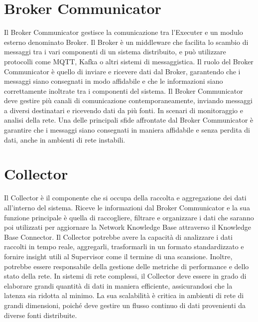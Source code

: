 \documentclass[target=bach,aauheader=,style=]{thud}
\begin{document}
\section{Broker Communicator}
Il Broker Communicator gestisce la comunicazione tra l'Executer e un modulo esterno denominato Broker. Il Broker è un middleware che facilita lo scambio di messaggi tra i vari componenti di un sistema distribuito, e può utilizzare protocolli come MQTT, Kafka \cite{kreps2015kafka} o altri sistemi di messaggistica. Il ruolo del Broker Communicator è quello di inviare e ricevere dati dal Broker, garantendo che i messaggi siano consegnati in modo affidabile e che le informazioni siano correttamente inoltrate tra i componenti del sistema.
Il Broker Communicator deve gestire più canali di comunicazione contemporaneamente, inviando messaggi a diversi destinatari e ricevendo dati da più fonti. In scenari di monitoraggio e analisi della rete. Una delle principali sfide affrontate dal Broker Communicator è garantire che i messaggi siano consegnati in maniera affidabile e senza perdita di dati, anche in ambienti di rete instabili. 

\section{Collector}
Il Collector è il componente che si occupa della raccolta e aggregazione dei dati all'interno del sistema. Riceve le informazioni dal Broker Communicator e la sua funzione principale è quella di raccogliere, filtrare e organizzare i dati che saranno poi utilizzati per aggiornare la Network Knowledge Base attraverso il Knowledge Base Connector.
Il Collector potrebbe avere la capacità di analizzare i dati raccolti in tempo reale, aggregarli, trasformarli in un formato standardizzato e fornire insight utili al Supervisor come il termine di una scansione. Inoltre, potrebbe essere responsabile della gestione delle metriche di performance e dello stato della rete. In sistemi di rete complessi, il Collector deve essere in grado di elaborare grandi quantità di dati in maniera efficiente, assicurandosi che la latenza sia ridotta al minimo. La sua scalabilità è critica in ambienti di rete di grandi dimensioni, poiché deve gestire un flusso continuo di dati provenienti da diverse fonti distribuite.
\end{document}
